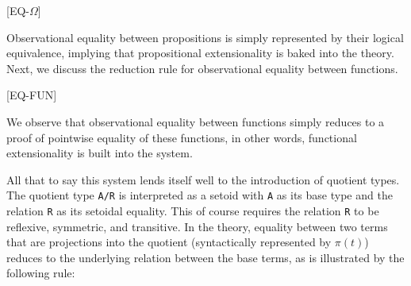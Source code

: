 \documentclass[12pt,twoside,maitrise]{dms}
\theoremstyle{definition}
\numberwithin{equation}{section}
\numberwithin{table}{chapter}
\numberwithin{figure}{chapter}
\newcommand\kw[1] {\textsf{#1}}
\newcommand\id[1] {\texttt{#1}}
\newcommand\fn[1] {\texttt{#1}}
\begin{document}
\begin{prooftree*}

  [\kw{EQ-$\Omega$}]{}
\end{prooftree*}

Observational equality between propositions is simply represented by their
logical equivalence, implying that propositional extensionality is baked into
the theory. Next, we discuss the reduction rule for observational equality
between functions.

\begin{prooftree*}

  [\kw{EQ-FUN}]{}
\end{prooftree*}

We observe that observational equality between functions simply reduces to a
proof of pointwise equality of these functions, in other words, functional
extensionality is built into the system.

All that to say this system lends itself well to the introduction of quotient
types. The quotient type \fn{A/R} is interpreted as a setoid with \id{A} as its
base type and the relation \id{R} as its setoidal equality. This of course
requires the relation \id{R} to be reflexive, symmetric, and transitive. In the
theory, equality between two terms that are projections into the quotient
(syntactically represented by $\pi(t)$) reduces to the underlying relation
between the base terms, as is illustrated by the following rule:


\end{document}
